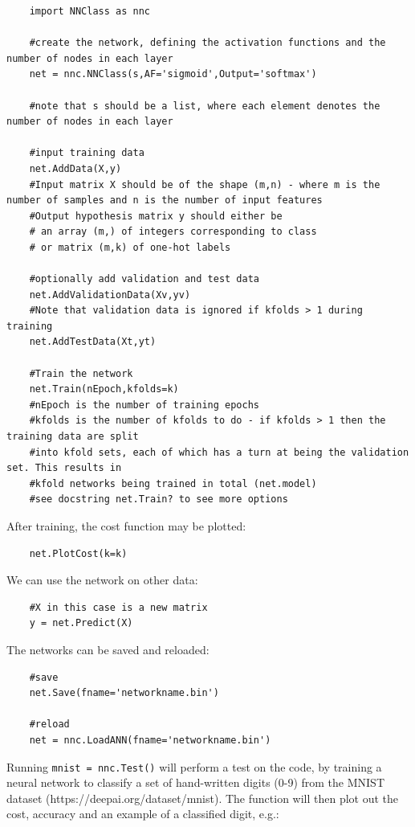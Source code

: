 	\begin{verbatim}
	import NNClass as nnc
	
	#create the network, defining the activation functions and the number of nodes in each layer
	net = nnc.NNClass(s,AF='sigmoid',Output='softmax')
	
	#note that s should be a list, where each element denotes the number of nodes in each layer
	
	#input training data
	net.AddData(X,y)
	#Input matrix X should be of the shape (m,n) - where m is the number of samples and n is the number of input features
	#Output hypothesis matrix y should either be
	# an array (m,) of integers corresponding to class
	# or matrix (m,k) of one-hot labels
	
	#optionally add validation and test data
	net.AddValidationData(Xv,yv)
	#Note that validation data is ignored if kfolds > 1 during training
	net.AddTestData(Xt,yt)
	
	#Train the network 
	net.Train(nEpoch,kfolds=k)
	#nEpoch is the number of training epochs
	#kfolds is the number of kfolds to do - if kfolds > 1 then the training data are split 
	#into kfold sets, each of which has a turn at being the validation set. This results in
	#kfold networks being trained in total (net.model)
	#see docstring net.Train? to see more options
	\end{verbatim}
	
	After training, the cost function may be plotted:
	
	\begin{verbatim}
	net.PlotCost(k=k)
	\end{verbatim}
	
	We can use the network on other data:
	
	\begin{verbatim}
	#X in this case is a new matrix
	y = net.Predict(X)
	\end{verbatim}
	
	The networks can be saved and reloaded:
	
	\begin{verbatim}
	#save
	net.Save(fname='networkname.bin')
	
	#reload
	net = nnc.LoadANN(fname='networkname.bin')
	\end{verbatim}
	
	Running \texttt{mnist = nnc.Test()} will perform a test on the code, by training a neural network to classify a set of hand-written digits (0-9) from the MNIST dataset (https://deepai.org/dataset/mnist). The function will then plot out the cost, accuracy and an example of a classified digit, e.g.:
	
